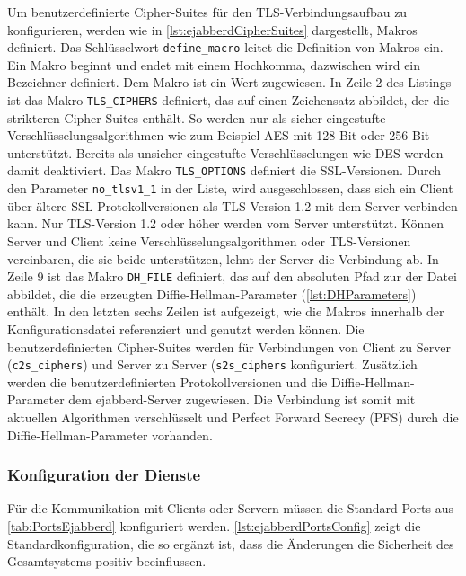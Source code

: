 \documentclass[a4paper,titlepage,halfparskip,12pt]{scrreprt}
\begin{document}
\begin{onehalfspacing}
Um benutzerdefinierte Cipher-Suites für den \ac{TLS}-Verbindungsaufbau zu konfigurieren, werden wie in \autoref{lst:ejabberdCipherSuites} dargestellt, Makros definiert. Das Schlüsselwort \texttt{define\_macro} leitet die Definition von Makros ein. Ein Makro beginnt und endet mit einem Hochkomma, dazwischen wird ein Bezeichner definiert. Dem Makro ist ein Wert zugewiesen. In Zeile 2 des Listings ist das Makro \texttt{TLS\_CIPHERS} definiert, das auf einen Zeichensatz abbildet, der die strikteren Cipher-Suites enthält. So werden nur als sicher eingestufte Verschlüsselungsalgorithmen wie zum Beispiel \ac{AES} mit 128 Bit oder 256 Bit unterstützt. Bereits als unsicher eingestufte Verschlüsselungen wie \ac{DES} werden damit deaktiviert. Das Makro \texttt{TLS\_OPTIONS} definiert die \ac{SSL}-Versionen. Durch den Parameter \texttt{no\_tlsv1\_1} in der Liste, wird ausgeschlossen, dass sich ein Client über ältere \ac{SSL}-Protokollversionen als \ac{TLS}-Version 1.2 mit dem Server verbinden kann. Nur \ac{TLS}-Version 1.2 oder höher werden vom Server unterstützt. Können Server und Client keine Verschlüsselungsalgorithmen oder \ac{TLS}-Versionen vereinbaren, die sie beide unterstützen, lehnt der Server die Verbindung ab. In Zeile 9 ist das Makro \texttt{DH\_FILE} definiert, das auf den absoluten Pfad zur der Datei abbildet, die die erzeugten Diffie-Hellman-Parameter (\autoref{lst:DHParameters}) enthält. In den letzten sechs Zeilen ist aufgezeigt, wie die Makros innerhalb der Konfigurationsdatei referenziert und genutzt werden können. Die benutzerdefinierten Cipher-Suites werden für Verbindungen von Client zu Server (\texttt{c2s\_ciphers}) und Server zu Server (\texttt{s2s\_ciphers} konfiguriert. Zusätzlich werden die benutzerdefinierten Protokollversionen und die Diffie-Hellman-Parameter dem ejabberd-Server zugewiesen. Die Verbindung ist somit mit aktuellen Algorithmen verschlüsselt und Perfect Forward Secrecy (\ac{PFS}) durch die Diffie-Hellman-Parameter vorhanden.

\subsubsection*{Konfiguration der Dienste}

Für die Kommunikation mit Clients oder Servern müssen die Standard-Ports aus \autoref{tab:PortsEjabberd} konfiguriert werden. \autoref{lst:ejabberdPortsConfig} zeigt die Standardkonfiguration, die so ergänzt ist, dass die Änderungen die Sicherheit des Gesamtsystems positiv beeinflussen.


\end{onehalfspacing}
\end{document}
